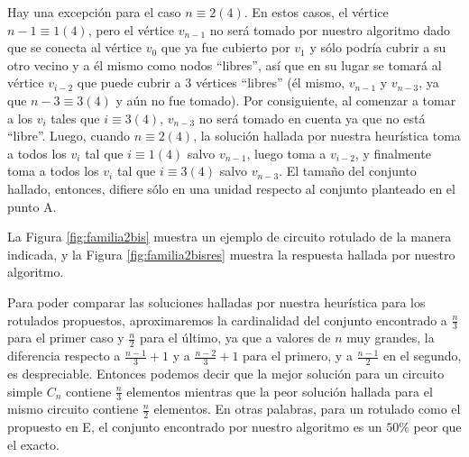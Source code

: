 Hay una excepción para el caso $n \equiv 2 (4)$. En estos casos, el vértice $n-1 \equiv 1 (4)$, pero el vértice $v_{n-1}$ no será tomado por nuestro algoritmo dado que se conecta al vértice $v_0$ que ya fue cubierto por $v_1$ y sólo podría cubrir a su otro vecino y a él mismo como nodos ``libres'', así que en su lugar se tomará al vértice $v_{i-2}$ que puede cubrir a 3 vértices ``libres'' (él mismo, $v_{n-1}$ y $v_{n-3}$, ya que $n-3 \equiv 3 (4)$ y aún no fue tomado). Por consiguiente, al comenzar a tomar a los $v_i$ tales que $i \equiv 3 (4)$, $v_{n-3}$ no será tomado en cuenta ya que no está ``libre''.  Luego, cuando $n \equiv 2 (4)$, la solución hallada por nuestra heurística toma a todos los $v_i$ tal que $i \equiv 1 (4)$ salvo $v_{n-1}$, luego toma a $v_{i-2}$, y finalmente toma a todos los $v_i$ tal que $i \equiv 3 (4)$ salvo $v_{n-3}$.  El tamaño del conjunto hallado, entonces, difiere sólo en una unidad respecto al conjunto planteado en el punto A.

La Figura \ref{fig:familia2bis} muestra un ejemplo de circuito rotulado de la manera indicada, y la Figura \ref{fig:familia2bisres} muestra la respuesta hallada por nuestro algoritmo.

\vspace*{0.3cm}

Para poder comparar las soluciones halladas por nuestra heurística para los rotulados propuestos, aproximaremos la cardinalidad del conjunto encontrado a $\frac{n}{3}$ para el primer caso y $\frac{n}{2}$ para el último, ya que a valores de $n$ muy grandes, la diferencia respecto a $\frac{n-1}{3}+1$ y a $\frac{n-2}{3}+1$ para el primero, y a $\frac{n-1}{2}$ en el segundo, es despreciable.  Entonces podemos decir que la mejor solución para un circuito simple $C_n$ contiene $\frac{n}{3}$ elementos mientras que la peor solución hallada para el mismo circuito contiene $\frac{n}{2}$ elementos.  En otras palabras, para un rotulado como el propuesto en E, el conjunto encontrado por nuestro algoritmo es un $50\%$ peor que el exacto.


